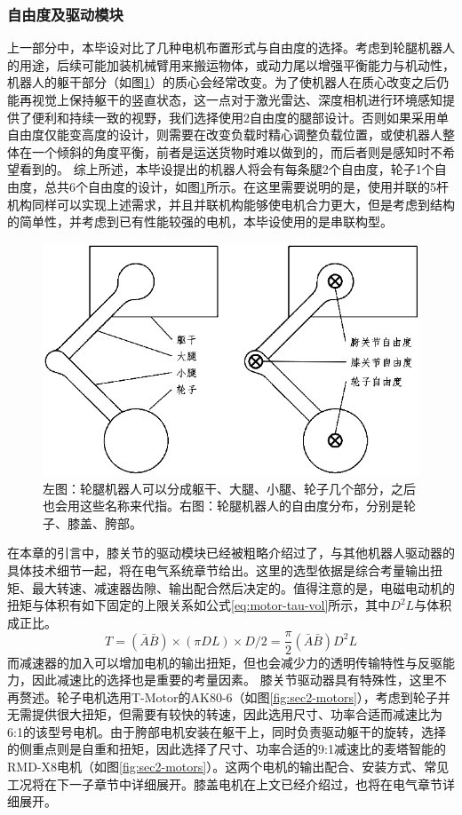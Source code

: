 \subsubsection{自由度及驱动模块}
上一部分中，本毕设对比了几种电机布置形式与自由度的选择。考虑到轮腿机器人的用途，后续可能加装机械臂用来搬运物体，或动力尾以增强平衡能力与机动性，机器人的躯干部分（如图\ref{fig:sec2-dof-parts}）的质心会经常改变。为了使机器人在质心改变之后仍能再视觉上保持躯干的竖直状态，这一点对于激光雷达、深度相机进行环境感知提供了便利和持续一致的视野，我们选择使用2自由度的腿部设计。否则如果采用单自由度仅能变高度的设计，则需要在改变负载时精心调整负载位置，或使机器人整体在一个倾斜的角度平衡，前者是运送货物时难以做到的，而后者则是感知时不希望看到的。
综上所述，本毕设提出的机器人将会有每条腿2个自由度，轮子1个自由度，总共6个自由度的设计，如图\ref{fig:sec2-dof-parts}所示。在这里需要说明的是，使用并联的5杆机构同样可以实现上述需求，并且并联机构能够使电机合力更大，但是考虑到结构的简单性，并考虑到已有性能较强的电机，本毕设使用的是串联构型。

\begin{figure}
  \centering
  \includegraphics[width=0.75\linewidth]{figures/Sec2/dof-parts.png}
  \caption{
  左图：轮腿机器人可以分成躯干、大腿、小腿、轮子几个部分，之后也会用这些名称来代指。右图：轮腿机器人的自由度分布，分别是轮子、膝盖、胯部。
  }
  \label{fig:sec2-dof-parts}
   \vspace{7pt}
\end{figure}

在本章的引言中，膝关节的驱动模块已经被粗略介绍过了，与其他机器人驱动器的具体技术细节一起，将在电气系统章节给出。这里的选型依据是综合考量输出扭矩、最大转速、减速器齿隙、输出配合然后决定的。值得注意的是，电磁电动机的扭矩与体积有如下固定的上限关系如公式\ref{eq:motor-tau-vol}\cite{hughes2006electric}所示，其中$D^2L$与体积成正比。
\begin{equation}
    T = (\bar{A}\bar{B})\times (\pi DL) \times D / 2 = \frac{\pi}{2} (\bar{A}\bar{B}) D^2 L
    \label{eq:motor-tau-vol}
\end{equation}
而减速器的加入可以增加电机的输出扭矩，但也会减少力的透明传输特性与反驱能力，因此减速比的选择也是重要的考量因素。
膝关节驱动器具有特殊性，这里不再赘述。轮子电机选用T-Motor的AK80-6（如图\ref{fig:sec2-motors}），考虑到轮子并无需提供很大扭矩，但需要有较快的转速，因此选用尺寸、功率合适而减速比为6:1的该型号电机。由于胯部电机安装在躯干上，同时负责驱动躯干的旋转，选择的侧重点则是自重和扭矩，因此选择了尺寸、功率合适的9:1减速比的麦塔智能的RMD-X8电机（如图\ref{fig:sec2-motors}）。这两个电机的输出配合、安装方式、常见工况将在下一子章节中详细展开。膝盖电机在上文已经介绍过，也将在电气章节详细展开。

